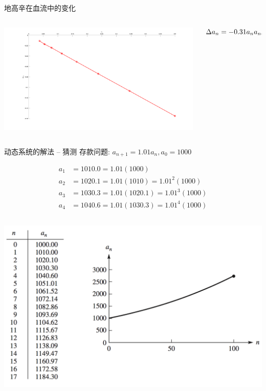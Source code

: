 \documentclass[
  ignorenonframetext,
]{ctexbeamer}
\begin{document}
\begin{frame}{地高辛在血流中的变化}
\begin{columns}[T]
\begin{column}{0.5\textwidth}
\includegraphics{images/digoxin.png}
\end{column}

\begin{column}{0.5\textwidth}
\[
\Delta a_n = -0.31a_n \\
a_{n+1} -  a_n = -0.31a_n \\
a_{n+1} = 0.69a_n
\]
\end{column}
\end{columns}
\end{frame}

\begin{frame}{动态系统的解法 -- 猜测}
\label{ux52a8ux6001ux7cfbux7edfux7684ux89e3ux6cd5-ux731cux6d4b}
存款问题: \(a_{n+1} = 1.01a_n, a_0 = 1000\)

\[
\begin{align*}
a_1 &= 1010.0 = 1.01(1000)\\
a_2 &= 1020.1 = 1.01(1010) = 1.01^2 (1000)\\
a_3 &= 1030.3 = 1.01(1020.1) = 1.01^3 (1000)\\
a_4 &= 1040.6 = 1.01(1030.3) = 1.01^4 (1000)
\end{align*}
\]

\begin{columns}[T]
\begin{column}{0.6\textwidth}
\includegraphics{saving.png}
\end{column}
\end{columns}
\end{frame}
\end{document}
